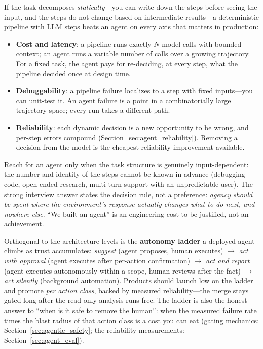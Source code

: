 \begin{keyinsight}
If the task decomposes \textit{statically}---you can write down the steps before seeing the input, and the steps do not change based on intermediate results---a deterministic pipeline with LLM steps beats an agent on every axis that matters in production:
\begin{itemize}
    \item \textbf{Cost and latency}: a pipeline runs exactly $N$ model calls with bounded context; an agent runs a variable number of calls over a growing trajectory. For a fixed task, the agent pays for re-deciding, at every step, what the pipeline decided once at design time.
    \item \textbf{Debuggability}: a pipeline failure localizes to a step with fixed inputs---you can unit-test it. An agent failure is a point in a combinatorially large trajectory space; every run takes a different path.
    \item \textbf{Reliability}: each dynamic decision is a new opportunity to be wrong, and per-step errors compound (Section~\ref{sec:agent_reliability}). Removing a decision from the model is the cheapest reliability improvement available.
\end{itemize}
Reach for an agent only when the task structure is genuinely input-dependent: the number and identity of the steps cannot be known in advance (debugging code, open-ended research, multi-turn support with an unpredictable user). The strong interview answer states the decision rule, not a preference: \textit{agency should be spent where the environment's response actually changes what to do next, and nowhere else}. ``We built an agent'' is an engineering cost to be justified, not an achievement.
\end{keyinsight}

Orthogonal to the architecture levels is the \textbf{autonomy ladder} a deployed agent climbs as trust accumulates: \textit{suggest} (agent proposes, human executes) $\rightarrow$ \textit{act with approval} (agent executes after per-action confirmation) $\rightarrow$ \textit{act and report} (agent executes autonomously within a scope, human reviews after the fact) $\rightarrow$ \textit{act silently} (background automation). Products should launch low on the ladder and promote \textit{per action class}, backed by measured reliability---the merge stays gated long after the read-only analysis runs free. The ladder is also the honest answer to ``when is it safe to remove the human'': when the measured failure rate times the blast radius of that action class is a cost you can eat (gating mechanics: Section~\ref{sec:agentic_safety}; the reliability measurements: Section~\ref{sec:agent_eval}).

